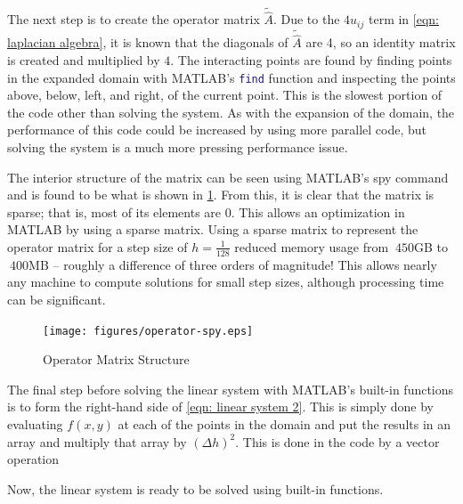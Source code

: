 \documentclass[10pt,a4paper]{article}
\begin{document}
The next step is to create the operator matrix $\tilde{\hat{A}}$. Due to the $4u_{ij}$ term in \cref{eqn: laplacian algebra}, it is known that the diagonals of $\tilde{\hat{A}}$ are 4, so an identity matrix is created and multiplied by $4$. The interacting points are found by finding points in the expanded domain with MATLAB's \lstinline[language=Matlab]|find| function and inspecting the points above, below, left, and right, of the current point. This is the slowest portion of the code other than solving the system. As with the expansion of the domain, the performance of this code could be increased by using more parallel code, but solving the system is a much more pressing performance issue.




The interior structure of the matrix can be seen using MATLAB's spy command and is found to be what is shown in \cref{fig: operator matrix}. From this, it is clear that the matrix is sparse; that is, most of its elements are 0. This allows an optimization in MATLAB by using a sparse matrix. Using a sparse matrix to represent the operator matrix  for a step size of $h = \frac{1}{128}$ reduced memory usage from $~450$GB to $~400$MB -- roughly a difference of three orders of magnitude! This allows nearly any machine to compute solutions for small step sizes, although processing time can be significant.

\begin{figure}[H]
\center
\texttt{[image: figures/operator-spy.eps]}
\caption{Operator Matrix Structure}
\label{fig: operator matrix}
\end{figure}

The final step before solving the linear system with MATLAB's built-in functions is to form the right-hand side of \cref{eqn: linear system 2}. This is simply done by evaluating $f(x,y)$ at each of the  points in the domain and put the results in an array and multiply that array by $\left( \Delta h \right)^2$. This is done in the code by a vector operation



Now, the linear system is ready to be solved using built-in functions.


\end{document}

